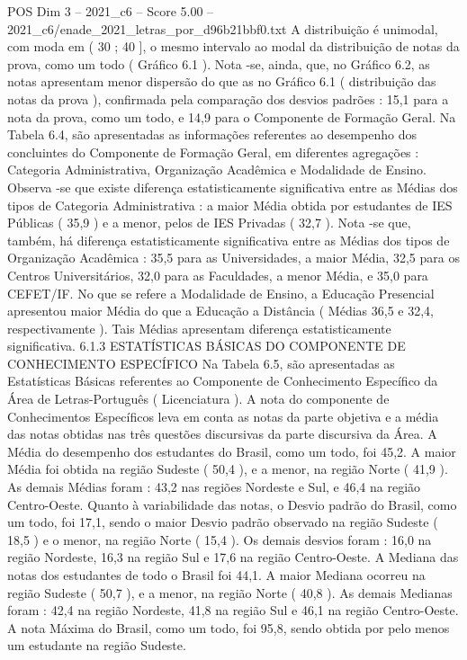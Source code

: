 \begin{textsample}{POS Dim 3 – 2021\_c6 – Score 5.00 – 2021\_c6/enade\_2021\_letras\_por\_d96b21bbf0.txt}
A distribuição é unimodal, com moda em ( 30 ; 40 ], o mesmo intervalo ao modal da distribuição de notas da prova, como um todo ( Gráfico 6.1 ).
Nota -se, ainda, que, no Gráfico 6.2, as notas apresentam menor dispersão do que as no Gráfico 6.1 ( distribuição das notas da prova ), confirmada pela comparação dos desvios padrões : 15,1 para a nota da prova, como um todo, e 14,9 para o Componente de Formação Geral.
Na Tabela 6.4, são apresentadas as informações referentes ao desempenho dos concluintes do Componente de Formação Geral, em diferentes agregações : Categoria Administrativa, Organização Acadêmica e Modalidade de Ensino.
Observa -se que existe diferença estatisticamente significativa entre as Médias dos tipos de Categoria Administrativa : a maior Média obtida por estudantes de IES Públicas ( 35,9 ) e a menor, pelos de IES Privadas ( 32,7 ).
Nota -se que, também, há diferença estatisticamente significativa entre as Médias dos tipos de Organização Acadêmica : 35,5 para as Universidades, a maior Média, 32,5 para os Centros Universitários, 32,0 para as Faculdades, a menor Média, e 35,0 para CEFET/IF.
No que se refere a Modalidade de Ensino, a Educação Presencial apresentou maior Média do que a Educação a Distância ( Médias 36,5 e 32,4, respectivamente ).
Tais Médias apresentam diferença estatisticamente significativa. 6.1.3 ESTATÍSTICAS BÁSICAS DO COMPONENTE DE CONHECIMENTO ESPECÍFICO Na Tabela 6.5, são apresentadas as Estatísticas Básicas referentes ao Componente de Conhecimento Específico da Área de Letras-Português ( Licenciatura ).
A nota do componente de Conhecimentos Específicos leva em conta as notas da parte objetiva e a média das notas obtidas nas três questões discursivas da parte discursiva da Área.
A Média do desempenho dos estudantes do Brasil, como um todo, foi 45,2.
A maior Média foi obtida na região Sudeste ( 50,4 ), e a menor, na região Norte ( 41,9 ).
As demais Médias foram : 43,2 nas regiões Nordeste e Sul, e 46,4 na região Centro-Oeste.
Quanto à variabilidade das notas, o Desvio padrão do Brasil, como um todo, foi 17,1, sendo o maior Desvio padrão observado na região Sudeste ( 18,5 ) e o menor, na região Norte ( 15,4 ).
Os demais desvios foram : 16,0 na região Nordeste, 16,3 na região Sul e 17,6 na região Centro-Oeste.
A Mediana das notas dos estudantes de todo o Brasil foi 44,1.
A maior Mediana ocorreu na região Sudeste ( 50,7 ), e a menor, na região Norte ( 40,8 ).
As demais Medianas foram : 42,4 na região Nordeste, 41,8 na região Sul e 46,1 na região Centro-Oeste.
A nota Máxima do Brasil, como um todo, foi 95,8, sendo obtida por pelo menos um estudante na região Sudeste.

\end{textsample}
